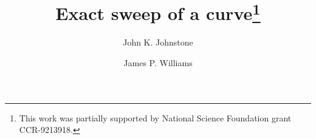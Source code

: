 \newcommand{\SingleSpace}{\edef\baselinestretch{0.9}\Large\normalsize}
\newcommand{\DoubleSpace}{\edef\baselinestretch{1.4}\Large\normalsize}
\newcommand{\Comment}[1]{\relax}  %
\newcommand{\Heading}[1]{\par\noindent{\bf#1}\nobreak}
\newcommand{\Tail}[1]{\nobreak\par\noindent{\bf#1}}
\newcommand{\QED}{\vrule height 1.4ex width 1.0ex depth -.1ex\ } %
\newcommand{\arc}[1]{\mbox{$\stackrel{\frown}{#1}$}}
\newcommand{\lyne}[1]{\mbox{$\stackrel{\leftrightarrow}{#1}$}}
\newcommand{\ray}[1]{\mbox{$\vec{#1}$}}          
\newcommand{\seg}[1]{\mbox{$\overline{#1}$}}
\newcommand{\tab}{\hspace*{.2in}}
\newcommand{\se}{\mbox{$_{\epsilon}$}}  %
\newcommand{\ie}{\mbox{i.e.}}
\newcommand{\eg}{\mbox{e.\ g.\ }}
\newcommand{\figg}[3]{\begin{figure}[htbp]\vspace{#3}\caption{#2}\label{#1}\end{figure}}
\newcommand{\be}{\begin{equation}}
\newcommand{\ee}{\end{equation}}
\newcommand{\prf}{\noindent{{\bf Proof} :\ }}
\newcommand{\choice}[2]{\left( \begin{array}{c} \mbox{\footnotesize{$#1$}} \\ \mbox{\footnotesize{$#2$}} \end{array} \right)}      
\newcommand{\ddt}{\frac{\partial}{\partial t}}

\newtheorem{rmk}{Remark}[section]
\newtheorem{example}{Example}[section]
\newtheorem{conjecture}{Conjecture}[section]
\newtheorem{claim}{Claim}[section]
\newtheorem{notation}{Notation}[section]
\newtheorem{lemma}{Lemma}[section]
\newtheorem{theorem}{Theorem}[section]
\newtheorem{corollary}{Corollary}[section]
\newtheorem{defn2}{Definition}

\DoubleSpace

\setlength{\oddsidemargin}{2mm}
\setlength{\evensidemargin}{2mm}
\setlength{\headsep}{0pt}
\setlength{\topmargin}{0pt}
\setlength{\textheight}{216mm}
\setlength{\textwidth}{156mm}

\title{Exact sweep of a curve\thanks{This work was partially supported by 
	National Science Foundation grant CCR-9213918.}}
\author{John K. Johnstone \and James P. Williams}


